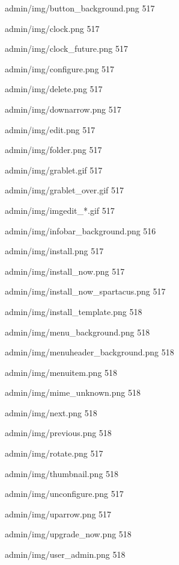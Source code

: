 \documentclass{book}
\renewcommand\subitem{\par}
\begin{document}
\begin{multicols}{2}
\begin{osp-index}
    \subitem admin/img/button\_background.png\hspace{1mm} 517
    \subitem admin/img/clock.png\hspace{1mm} 517
    \subitem admin/img/clock\_future.png\hspace{1mm} 517
    \subitem admin/img/configure.png\hspace{1mm} 517
    \subitem admin/img/delete.png\hspace{1mm} 517
    \subitem admin/img/downarrow.png\hspace{1mm} 517
    \subitem admin/img/edit.png\hspace{1mm} 517
    \subitem admin/img/folder.png\hspace{1mm} 517
    \subitem admin/img/grablet.gif\hspace{1mm} 517
    \subitem admin/img/grablet\_over.gif\hspace{1mm} 517
    \subitem admin/img/imgedit\_*.gif\hspace{1mm} 517
    \subitem admin/img/infobar\_background.png\hspace{1mm} 516
    \subitem admin/img/install.png\hspace{1mm} 517
    \subitem admin/img/install\_now.png\hspace{1mm} 517
    \subitem admin/img/install\_now\_spartacus.png\hspace{1mm} 517
    \subitem admin/img/install\_template.png\hspace{1mm} 518
    \subitem admin/img/menu\_background.png\hspace{1mm} 518
    \subitem admin/img/menuheader\_background.png\hspace{1mm} 518
    \subitem admin/img/menuitem.png\hspace{1mm} 518
    \subitem admin/img/mime\_unknown.png\hspace{1mm} 518
    \subitem admin/img/next.png\hspace{1mm} 518
    \subitem admin/img/previous.png\hspace{1mm} 518
    \subitem admin/img/rotate.png\hspace{1mm} 517
    \subitem admin/img/thumbnail.png\hspace{1mm} 518
    \subitem admin/img/unconfigure.png\hspace{1mm} 517
    \subitem admin/img/uparrow.png\hspace{1mm} 517
    \subitem admin/img/upgrade\_now.png\hspace{1mm} 518
    \subitem admin/img/user\_admin.png\hspace{1mm} 518

\end{osp-index}
\end{multicols}
\end{document}

